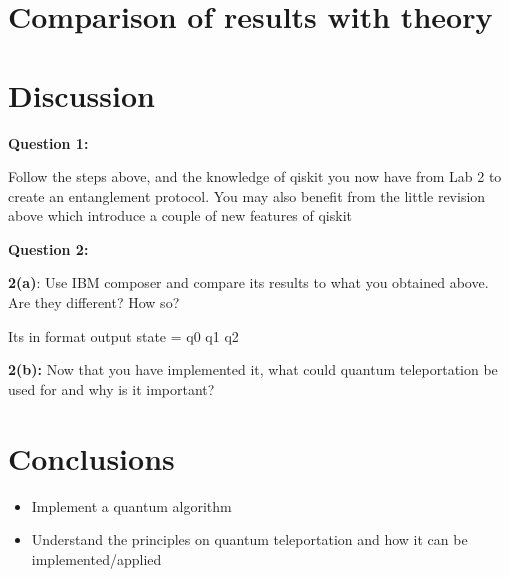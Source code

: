 \section{Comparison of results with theory}
\section{Discussion} \label{sec:discussTeleport}
\textbf{Question 1:}

Follow the steps above, and the knowledge of qiskit you now have from Lab 2 to create an entanglement protocol. You may also benefit from the little revision above which introduce a couple of new features of qiskit

\textbf{Question 2:}

\textbf{2(a)}: Use IBM composer and compare its results to what you obtained above. Are they different? How so?

Its in format output state = q0 q1 q2

\textbf{2(b):} Now that you have implemented it, what could quantum teleportation be used for and why is it important?

\section{Conclusions}

\begin{itemize}
    \item Implement a quantum algorithm
    \item Understand the principles on quantum teleportation and how it can be implemented/applied
\end{itemize}